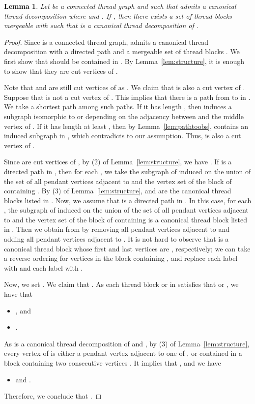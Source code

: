 \documentclass[11pt]{article}
\newtheorem{lemma}[theorem]{Lemma}
\theoremstyle{remark}
\begin{document}
\begin{lemma}\label{lem:extendthread}
Let  be a connected thread graph and  such that
 admits a canonical thread decomposition  where 
 and
.
If , then there exists a set  of thread blocks mergeable with 
such that
 is a canonical thread decomposition of .
\end{lemma}
\begin{proof}
Since  is a connected thread graph,
 admits a canonical thread decomposition  with a directed path  and a mergeable set of thread blocks . We first show that  should be contained in .
By Lemma~\ref{lem:structure}, it is enough to show that they are cut vertices of .

Note that  and  are still cut vertices of  as .
We claim that  is also a cut vertex of .
Suppose that  is not a cut vertex of . This implies that there is a path from  to  in .
We take a shortest path  among such paths.
If it has length , then  induces a subgraph isomorphic to  or  depending on the adjacency between  and the middle vertex of .
If it has length at least , then by Lemma~\ref{lem:pathtoobs},  contains an induced subgraph in , which contradicts to our assumption.
Thus,  is also a cut vertex of .

Since  are cut vertices of , by (2) of Lemma~\ref{lem:structure}, we have . 
If  is a directed path in , then 
for each , we take the subgraph  of  induced on the union of the set of all pendant vertices adjacent to  and the vertex set of the block of  containing .
By (3) of Lemma~\ref{lem:structure},  and  are the canonical thread blocks listed in . 
Now, we assume that  is a directed path in .
In this case, for each , 
the subgraph  of  induced on the union of the set of all pendant vertices adjacent to   and the vertex set of the block of  containing 
is a canonical thread block listed in .
Then we obtain  from  by removing all pendant vertices adjacent to  and adding all pendant vertices adjacent to .
It is not hard to observe that  is a canonical thread block whose first and last vertices are , respectively; we can take a reverse ordering for vertices in the block containing , and replace each label  with  and each label  with .



Now, we set . We claim that . 
As each thread block  or  in  satisfies that  or , 
we have that 
\begin{itemize}
\item , and
\item .
\end{itemize}
As  is a canonical thread decomposition of  and , by (3) of Lemma~\ref{lem:structure}, 
every vertex of  is either a pendant vertex adjacent to one of , 
or
contained in a block containing two consecutive vertices .
It implies that , and we have
\begin{itemize}
\item  and .
\end{itemize}
Therefore, we conclude that .
\end{proof}
\end{document}

